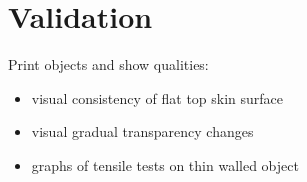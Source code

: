 \section{Validation}
Print objects and show qualities:
\begin{itemize}
\item visual consistency of flat top skin surface
\item visual gradual transparency changes
\item graphs of tensile tests on thin walled object
\end{itemize}











